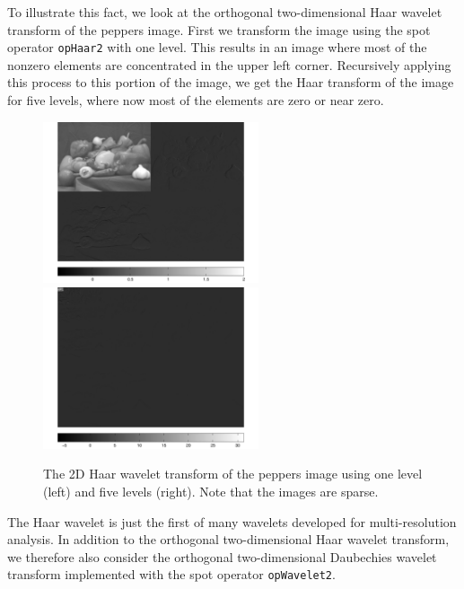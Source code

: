 \documentclass[10pt,a4paper]{article}
\begin{document}
To illustrate this fact, we look at the orthogonal two-dimensional Haar wavelet transform of the peppers image. First we transform the image using the spot operator {\tt opHaar2} with one level. This results in an image where most of the nonzero elements are concentrated in the upper left corner. Recursively applying this process to this portion of the image, we get the Haar transform of the image for five levels, where now most of the elements are zero or near zero. 

\begin{figure}[H]
\centering
\includegraphics[width=2.5in]{../figures/haarTrans2} \quad
\includegraphics[width=2.5in]{../figures/haarTrans3}
\caption{The 2D Haar wavelet transform of the peppers image using one level (left) and five levels (right). Note that the images are sparse. }
\end{figure}

The Haar wavelet is just the first of many wavelets developed for multi-resolution analysis. In addition to the orthogonal two-dimensional Haar wavelet transform, we therefore also consider the orthogonal two-dimensional Daubechies wavelet transform implemented with the spot operator {\tt opWavelet2}. 

\end{document}
